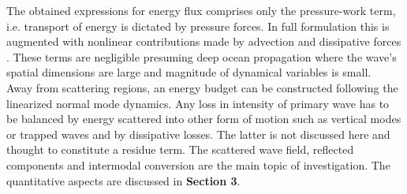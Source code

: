 \documentclass[12pt]{article}
\begin{document}
The obtained expressions for energy flux comprises only the pressure-work term, i.e. transport of 
energy is dictated by pressure forces. In full formulation this is augmented with nonlinear 
contributions made by advection and dissipative forces \citep{gill2016atmosphere}. These terms 
are negligible presuming deep ocean propagation where the wave's spatial dimensions are large and 
magnitude of dynamical variables is small.\\
Away from scattering regions, an energy budget can be constructed following the linearized normal 
mode dynamics. Any loss in intensity of primary wave has to be balanced by energy scattered into 
other form of motion such as vertical modes or trapped waves and by dissipative losses. The latter 
is not discussed here and thought to constitute a residue term. The scattered wave field, 
reflected components and intermodal conversion are the main topic of investigation. The 
quantitative aspects are discussed in \textbf{Section 3}.\\
\end{document}
